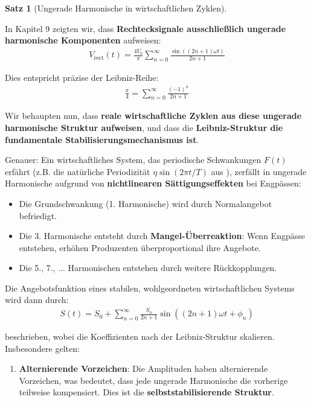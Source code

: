 \documentclass[a4paper, 12pt, twoside, openright]{report}
\theoremstyle{definition}
\theoremstyle{definition}
\newtheorem{satz}{Satz}[chapter]
\begin{document}
\begin{satz}[Ungerade Harmonische in wirtschaftlichen Zyklen]
\label{satz:leibniz_oekonomie}

In Kapitel 9 zeigten wir, dass \textbf{Rechtecksignale ausschließlich ungerade harmonische Komponenten} aufweisen:
\begin{align}
V_{\text{rect}}(t) = \frac{4V_0}{\pi} \sum_{n=0}^{\infty} \frac{\sin((2n+1)\omega t)}{2n+1}
\end{align}

Dies entspricht präzise der Leibniz-Reihe:
\begin{align}
\frac{\pi}{4} = \sum_{n=0}^{\infty} \frac{(-1)^n}{2n+1}
\end{align}

Wir behaupten nun, dass \textbf{reale wirtschaftliche Zyklen aus \cite{epp_signal} diese ungerade harmonische Struktur aufweisen}, und dass die \textbf{Leibniz-Struktur die fundamentale Stabilisierungsmechanismus ist}.

Genauer: Ein wirtschaftliches System, das periodische Schwankungen $F(t)$ erfährt (z.B. die natürliche Periodizität $\eta \sin(2\pi t/T)$ aus \cite{epp_signal}), zerfällt in ungerade Harmonische aufgrund von \textbf{nichtlinearen Sättigungseffekten} bei Engpässen:
\begin{itemize}
\item Die Grundschwankung (1. Harmonische) wird durch Normalangebot befriedigt.
\item Die 3. Harmonische entsteht durch \textbf{Mangel-Überreaktion}: Wenn Engpässe entstehen, erhöhen Produzenten überproportional ihre Angebote.
\item Die 5., 7., ... Harmonischen entstehen durch weitere Rückkopplungen.
\end{itemize}

Die Angebotsfunktion eines stabilen, wohlgeordneten wirtschaftlichen Systems wird dann durch:
\begin{align}
S(t) = S_0 + \sum_{n=0}^{\infty} \frac{S_n}{2n+1} \sin((2n+1)\omega t + \phi_n)
\end{align}

beschrieben, wobei die Koeffizienten nach der Leibniz-Struktur skalieren. Insbesondere gelten:

\begin{enumerate}

\item \textbf{Alternierende Vorzeichen}: Die Amplituden haben alternierende Vorzeichen, was bedeutet, dass jede ungerade Harmonische die vorherige teilweise kompensiert. Dies ist die \textbf{selbststabilisierende Struktur}.


\end{enumerate}
\end{satz}
\end{document}
